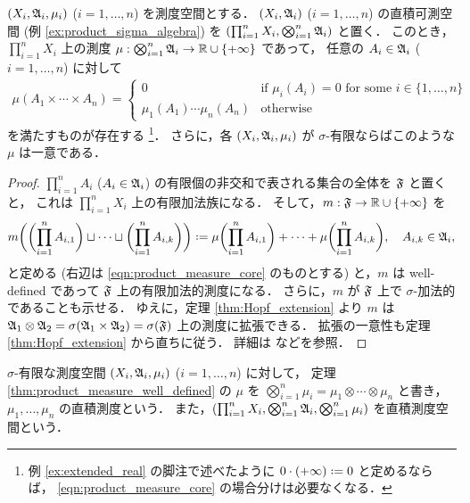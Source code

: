 \begin{theorem}\label{thm:product_measure_well_defined}
    $(X_i,\mathfrak{A}_i,\mu_i)$ ($i=1,\ldots,n$) を測度空間とする．
    $(X_i,\mathfrak{A}_i)$ ($i=1,\ldots,n$) の直積可測空間 (例 \ref{ex:product_sigma_algebra}) を $(\prod_{i=1}^nX_i,\bigotimes_{i=1}^n\mathfrak{A}_i)$ と置く．
    このとき，$\prod_{i=1}^nX_i$ 上の測度 $\mu:\bigotimes_{i=1}^n\mathfrak{A}_i\to\mathbb{R}\cup\{+\infty\}$ であって，
    任意の $A_i\in\mathfrak{A}_i$ ($i=1,\ldots,n$) に対して
    \begin{align}
        \mu(A_1\times\cdots\times A_n)=\begin{cases}
            0&\text{if $\mu_i(A_i)=0$ for some $i\in\{1,\ldots,n\}$}\\
            \mu_1(A_1)\cdots\mu_n(A_n)&\text{otherwise}
        \end{cases}
        \label{eqn:product_measure_core}
    \end{align}
    を満たすものが存在する
    \footnote{例 \ref{ex:extended_real} の脚注で述べたように $0\cdot(+\infty)\defeq0$ と定めるならば，
    \eqref{eqn:product_measure_core} の場合分けは必要なくなる．}．
    さらに，各 $(X_i,\mathfrak{A}_i,\mu_i)$ が $\sigma$-有限ならばこのような $\mu$ は一意である．
\end{theorem}

\begin{proof}
    $\prod_{i=1}^nA_i$ ($A_i\in\mathfrak{A}_i$) の有限個の非交和で表される集合の全体を $\mathfrak{F}$ と置くと，
    これは $\prod_{i=1}^nX_i$ 上の有限加法族になる．
    そして，$m:\mathfrak{F}\to\mathbb{R}\cup\{+\infty\}$ を
    \begin{align*}
        m\biggl(\biggl(\prod_{i=1}^nA_{i,1}\biggr)\sqcup\cdots\sqcup\biggl(\prod_{i=1}^nA_{i,k}\biggr)\biggr)
        \defeq\mu\biggl(\prod_{i=1}^nA_{i,1}\biggr)+\cdots+\mu\biggl(\prod_{i=1}^nA_{i,k}\biggr),\quad
        A_{i,k}\in\Afrak_i,
    \end{align*}
    と定める (右辺は \eqref{eqn:product_measure_core} のものとする) と，$m$ は well-defined であって
    $\mathfrak{F}$ 上の有限加法的測度になる．
    さらに，$m$ が $\mathfrak{F}$ 上で $\sigma$-加法的であることも示せる．
    ゆえに，定理 \ref{thm:Hopf_extension} より $m$ は
    $\mathfrak{A}_1\otimes\mathfrak{A}_2=\sigma(\mathfrak{A}_1\times\mathfrak{A}_2)=\sigma(\mathfrak{F})$ 上の測度に拡張できる．
    拡張の一意性も定理 \ref{thm:Hopf_extension} から直ちに従う．
    詳細は \cite[\S2.5]{Fo99} などを参照．
\end{proof}

\begin{definition}\label{def:product_measure}
    $\sigma$-有限な測度空間 $(X_i,\mathfrak{A}_i,\mu_i)$ ($i=1,\ldots,n$) に対して，
    定理 \ref{thm:product_measure_well_defined} の $\mu$ を $\bigotimes_{i=1}^n\mu_i=\mu_1\otimes\cdots\otimes\mu_n$ と書き，
    $\mu_1,\ldots,\mu_n$ の直積測度という．
    また，$(\prod_{i=1}^nX_i,\bigotimes_{i=1}^n\mathfrak{A}_i,\bigotimes_{i=1}^n\mu_i)$ を直積測度空間という．
\end{definition}

